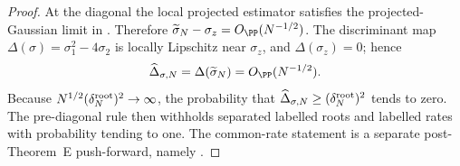 \begin{proof}
At the diagonal the local projected estimator satisfies the projected-Gaussian
limit in .  Therefore
\(\widetilde\sigma_N-\sigma_z=O_{\PP}(N^{-1/2})\).  The discriminant map
\(\Delta(\sigma)=\sigma_1^2-4\sigma_2\) is locally Lipschitz near
\(\sigma_z\), and \(\Delta(\sigma_z)=0\); hence
\[
\widehat\Delta_{\sigma,N}
=\Delta(\widetilde\sigma_N)=O_{\PP}(N^{-1/2}).
\]
Because \(N^{1/2}(\delta_N^{\rm root})^2\to\infty\), the probability that
\(\widehat\Delta_{\sigma,N}\ge(\delta_N^{\rm root})^2\) tends to zero.  The
pre-diagonal rule then withholds separated labelled roots and labelled rates
with probability tending to one.  The common-rate statement is a separate
post-Theorem~E push-forward, namely
.
\end{proof}

